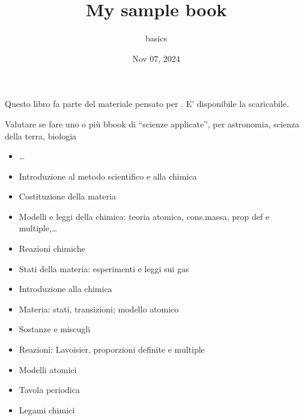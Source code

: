 \documentclass[letterpaper,10pt,english]{jupyterBook}
\title{My sample book}
\date{Nov 07, 2024}
\author{basics}
\begin{document}
\pagestyle{empty}
\sphinxmaketitle
\pagestyle{plain}
\sphinxtableofcontents
\pagestyle{normal}
\label{\detokenize{intro::doc}}


\sphinxAtStartPar
Questo libro fa parte del materiale pensato per . E’ disponibile la  scaricabile.

\sphinxAtStartPar
Valutare se fare uno o più bbook di “scienze applicate”, per astronomia, scienza della terra, biologia

\sphinxAtStartPar
{}



\sphinxAtStartPar
{}
\begin{itemize}
\item {} 
\sphinxAtStartPar
{}…

\item {} 
\sphinxAtStartPar
Introduzione al metodo scientifico e alla chimica

\item {} 
\sphinxAtStartPar
Costituzione della materia

\item {} 
\sphinxAtStartPar
Modelli e leggi della chimica: teoria atomica, cons.massa, prop def e multiple,…

\item {} 
\sphinxAtStartPar
Reazioni chimiche

\item {} 
\sphinxAtStartPar
Stati della materia: esperimenti e leggi sui gas

\end{itemize}

\sphinxAtStartPar
{}
\begin{itemize}
\item {} 
\sphinxAtStartPar
Introduzione alla chimica

\item {} 
\sphinxAtStartPar
Materia: stati, transizioni; modello atomico

\item {} 
\sphinxAtStartPar
Sostanze e miscugli

\item {} 
\sphinxAtStartPar
Reazioni: Lavoisier, proporzioni definite e multiple

\item {} 
\sphinxAtStartPar
Modelli atomici

\item {} 
\sphinxAtStartPar
Tavola periodica

\item {} 
\sphinxAtStartPar
Legami chimici

\end{itemize}
\end{document}

